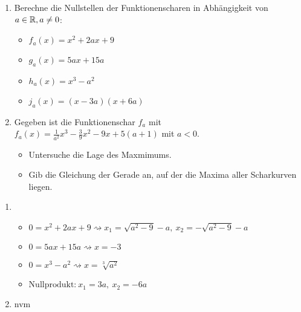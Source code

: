 






\begin{enumerate}
  \item Berechne die Nullstellen der Funktionenscharen in Abhängigkeit von $a\in \mathbb{R}, a\neq 0$:
  \begin{itemize}
    \item $f_a(x)=x^2+2ax+9$
    \item $g_a(x)=5ax+15a$
    \item $h_a(x)=x^3-a^2$
    \item $j_a(x)=(x-3a)(x+6a)$
  \end{itemize}
  \item Gegeben ist die Funktionenschar $f_a$ mit $f_a(x)=\frac{1}{a^2}x^3-\frac{3}{9}x^2-9x+5(a+1)$ mit $a<0$.
  \begin{itemize}
    \item Untersuche die Lage des Maxmimums.
    \item Gib die Gleichung der Gerade an, auf der die Maxima aller Scharkurven liegen.
  \end{itemize}
\end{enumerate}
\begin{lsg}{}
	\begin{enumerate}
		\item \begin{itemize}
			\item $0=x^2+2ax+9 \rightsquigarrow x_1=\sqrt{a^2-9}-a,\ x_2=-\sqrt{a^2-9}-a$\\
			\item $0=5ax+15a \rightsquigarrow x=-3$\\
			\item $0=x^3-a^2 \rightsquigarrow x=\sqrt[3]{a^2}$\\
			\item $\text{Nullprodukt:}\ x_1=3a,\ x_2=-6a$
		\end{itemize}
		\item nvm

	\end{enumerate}
\end{lsg}


